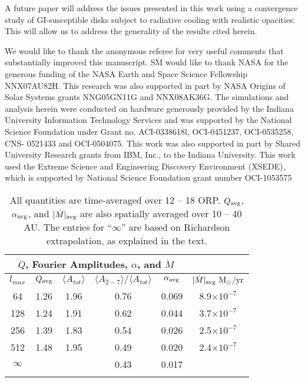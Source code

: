 \documentclass[manuscript]{aastex}
\begin{document}
A future paper will address the issues presented in this work using a convergence study of GI-susceptible disks subject to radiative cooling with realistic opacities.  This will allow us to address the generality of the results cited herein.

\acknowledgements

We would like to thank the anonymous referee for very useful comments that substantially improved this manuscript. SM
would like to thank NASA for the generous funding of the NASA Earth and Space Science Fellowship
NNX07AU82H. This research was also supported in part by NASA Origins of Solar Systems grants NNG05GN11G and
NNX08AK36G. The simulations and analysis herein were conducted on hardware generously provided by the Indiana
University Information Technology Services and was supported by the National Science Foundation under Grant
no. ACI-0338618l, OCI-0451237, OCI-0535258, CNS- 0521433 and OCI-0504075. This work was also supported in part
by Shared University Research grants from IBM, Inc., to the Indiana University. This work used the Extreme Science and Engineering Discovery Environment (XSEDE), which is supported by National Science Foundation grant number OCI-1053575






\newpage

\begin{table}
\begin{center}
\begin{tabular}{cccccc}
\multicolumn{5}{c}{$Q$, Fourier Amplitudes, $\alpha$, and $\dot{M}$}\\ \hline\hline
$l_{max}$ & $Q_{\rm avg}$   & $\langle A_{tot} \rangle$   & $\langle A_{2-7} \rangle / \langle A_{tot} \rangle$ &
$\alpha_{\rm avg}$ & $|\dot{M}|_{\rm avg} ~\mathrm{M_\odot/yr}$\\\hline
64   & 1.26 & 1.96 &  0.76 & 0.069 & 8.9$ \times 10^{-7}$ \\
128 & 1.24 & 1.91 &  0.62 & 0.044 & 3.7$ \times 10^{-7}$ \\
256 & 1.39 & 1.83 &  0.54 & 0.026 & 2.5$ \times 10^{-7}$ \\
512 & 1.48 & 1.95 &  0.49 & 0.020 & 2.4$ \times 10^{-7}$ \\ 
$\infty$ & & &0.43 & 0.017 & \\ \hline
\label{tbl:ams}
\end{tabular}
\caption{ All quantities are time-averaged over 12 -- 18 ORP.
$Q_{\rm avg}$, $\alpha_{\rm avg}$, and $|\dot{M}|_{\rm avg}$  are also spatially
averaged over 10 -- 40 AU.  The entries for ``$\infty$'' are based on Richardson extrapolation,
as explained in the text.}  
\end{center}
\end{table}
\end{document}
